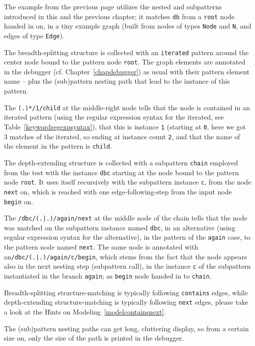 \begin{example}

The example from the previous page utilizes the nested and subpatterns introduced in this and the previous chapter;
it matches \texttt{db} from a \texttt{root} node handed in on, in a tiny example graph (built from nodes of types \texttt{Node} and \texttt{N}, and edges of type \texttt{Edge}). 

The breadth-splitting structure is collected with an \texttt{iterated} pattern around the center node bound to the pattern node \texttt{root}.
The graph elements are annotated in the debugger (cf. Chapter~\ref{chapdebugger}) as usual with their pattern element name -- plus the (sub)pattern nesting path that lead to the instance of this pattern.

The \verb#(.)*/1/child# at the middle-right node tells that the node is contained in an iterated pattern (using the regular expression syntax for the iterated, see Table~\ref{keywordregexpsyntax}), that this is instance \texttt{1} (starting at \texttt{0}, here we got 3 matches of the iterated, so ending at instance count \texttt{2}, and that the name of the element in the pattern is \texttt{child}.

The depth-extending structure is collected with a subpattern \texttt{chain} employed from the test with the instance \texttt{dbc} starting at the node bound to the pattern node \texttt{root}.
It uses itself recursively with the subpattern instance \texttt{c}, from the node \texttt{next} on, which is reached with one edge-following-step from the input node \texttt{begin} on.

The \verb#/dbc/(.|.)/again/next# at the middle node of the chain tells that the node was matched on the subpattern instance named \texttt{dbc}, in an alternative (using regular expression syntax for the alternative), in the pattern of the \texttt{again} case, to the pattern node named \texttt{next}.
The same node is annotated with an\verb#/dbc/(.|.)/again/c/begin#, which stems from the fact that the node appears also in the next nesting step (subpattern call), in the instance \texttt{c} of the subpattern instantiated in the branch \texttt{again}; as \texttt{begin} node handed in to \texttt{chain}.

Breadth-splitting structure-matching is typically following \texttt{contains} edges, while depth-extending structure-matching is typically following \texttt{next} edges, please take a look at the Hints on Modeling~\ref{modelcontainsnext}. 

The (sub)pattern nesting paths can get long, cluttering display, so from a certain size on, only the size of the path is printed in the debugger. 

\end{example}


